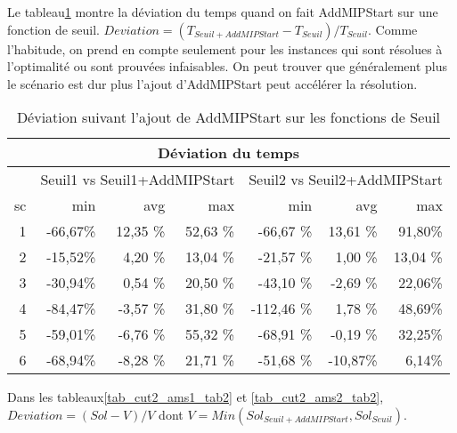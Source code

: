 Le tableau\ref{tab_cut2_ams2_tab1} montre la déviation du temps quand on fait AddMIPStart sur une fonction de seuil. $Deviation = (T_{Seuil+AddMIPStart}-T_{Seuil})/T_{Seuil}$. Comme l'habitude, on prend en compte seulement pour les instances qui sont résolues à l'optimalité ou sont prouvées infaisables. On peut trouver que généralement plus le scénario est dur plus l'ajout d'AddMIPStart peut accélérer la résolution. 
\begin{table}[h]
    \centering
    \begin{tabular}{|r|r|r|r|r|r|r|}
    	\hline
    	\multicolumn{7}{|c|}{Déviation du temps}	\\ \hline
&\multicolumn{3}{c|}{Seuil1 vs Seuil1+AddMIPStart} &\multicolumn{3}{c|}{Seuil2 vs Seuil2+AddMIPStart}	\\ \hline
sc&min	    &avg	    & max	  &min	    &avg	   & max \\ \hline
1&-66,67\%&	12,35	\%&52,63  \%&-66,67	\%&13,61 \%&	91,80\%\\ \hline
2&-15,52\%&	4,20	\%&13,04  \%&-21,57	\%&1,00	\%&13,04  \%   \\ \hline
3&-30,94\%&	0,54	\%&20,50  \%&-43,10	\%&-2,69 \%&	22,06\%\\ \hline
4&-84,47\%&	-3,57	\%&31,80  \%&-112,46	\%&1,78	\%&48,69\% \\ \hline
5&-59,01\%&	-6,76	\%&55,32  \%&-68,91	\%&-0,19 \%&	32,25\%\\ \hline
6&-68,94\%&	-8,28	\%&21,71  \%&-51,68	\%&-10,87\%&	6,14\% \\ \hline
    \end{tabular}
    \caption{Déviation suivant l'ajout de AddMIPStart sur les fonctions de Seuil}
    \label{tab_cut2_ams2_tab1}
\end{table}

Dans les tableaux\ref{tab_cut2_ams1_tab2} et \ref{tab_cut2_ams2_tab2}, $Deviation = (Sol-V)/V$ dont $V =Min(Sol_{Seuil+AddMIPStart},Sol_{Seuil})$.

